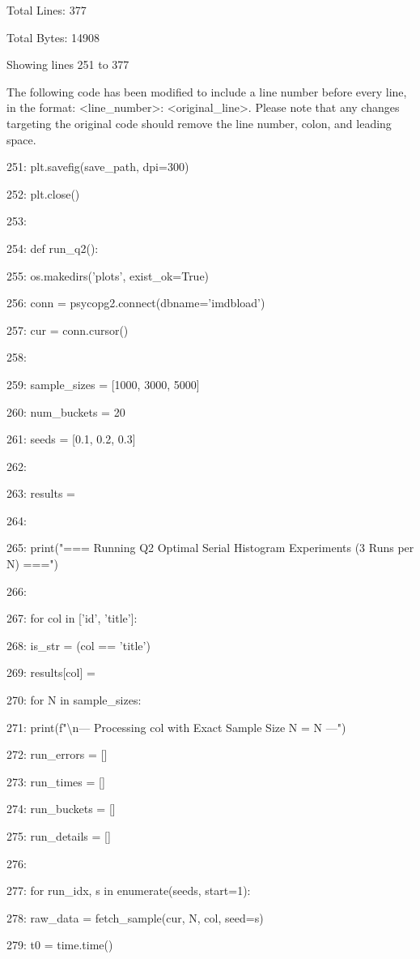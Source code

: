 \documentclass[11pt,a4paper]{article}
\begin{document}
Total Lines: 377

Total Bytes: 14908

Showing lines 251 to 377

The following code has been modified to include a line number before every line, in the format: <line\_number>: <original\_line>. Please note that any changes targeting the original code should remove the line number, colon, and leading space.

251:     plt.savefig(save\_path, dpi=300)

252:     plt.close()

253:

254: def run\_q2():

255:     os.makedirs('plots', exist\_ok=True)

256:     conn = psycopg2.connect(dbname='imdbload')

257:     cur = conn.cursor()

258:

259:     sample\_sizes = [1000, 3000, 5000]

260:     num\_buckets = 20

261:     seeds = [0.1, 0.2, 0.3]

262:

263:     results = {}

264:

265:     print("=== Running Q2 Optimal Serial Histogram Experiments (3 Runs per N) ===")

266:

267:     for col in ['id', 'title']:

268:         is\_str = (col == 'title')

269:         results[col] = {}

270:         for N in sample\_sizes:

271:             print(f"\textbackslash{}n--- Processing {col} with Exact Sample Size N = {N} ---")

272:             run\_errors = []

273:             run\_times = []

274:             run\_buckets = []

275:             run\_details = []

276:

277:             for run\_idx, s in enumerate(seeds, start=1):

278:                 raw\_data = fetch\_sample(cur, N, col, seed=s)

279:                 t0 = time.time()
\end{document}
